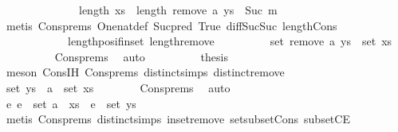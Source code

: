 \begin{isabellebody}
\ \ \ \ \isamarkupfalse%
\ {\isacharminus}\isanewline
\ \ \ \ \ \ \isamarkupfalse%
\ {\isachardoublequoteopen}length\ xs\ {\isacharminus}\ length\ {\isacharparenleft}remove{}\ a\ ys{\isacharparenright}\ {\isacharequal}\ Suc\ m{\isachardoublequoteclose}\isanewline
\ \ \ \ \ \ \ \ \isamarkupfalse%
\ {\isacharparenleft}metis\ Cons{\isachardot}prems{\isacharparenleft}{}{\isacharparenright}\ One{\isacharunderscore}nat{\isacharunderscore}def\ Suc{\isacharunderscore}pred\ True\ diff{\isacharunderscore}Suc{\isacharunderscore}Suc\ length{\isacharunderscore}Cons\isanewline
\ \ \ \ \ \ \ \ \ \ \ \ length{\isacharunderscore}pos{\isacharunderscore}if{\isacharunderscore}in{\isacharunderscore}set\ length{\isacharunderscore}remove{}{\isacharparenright}\isanewline
\ \ \ \ \ \ \isamarkupfalse%
\ \isamarkupfalse%
\ {\isachardoublequoteopen}set\ {\isacharparenleft}remove{}\ a\ ys{\isacharparenright}\ {\isasymsubseteq}\ set\ xs{\isachardoublequoteclose}\isanewline
\ \ \ \ \ \ \ \ \isamarkupfalse%
\ Cons{\isachardot}prems\ \isamarkupfalse%
\ auto\isanewline
\ \ \ \ \ \ \isamarkupfalse%
\ \isamarkupfalse%
\ {\isacharquery}thesis\isanewline
\ \ \ \ \ \ \ \ \isamarkupfalse%
\ {\isacharparenleft}meson\ Cons{\isachardot}IH\ Cons{\isachardot}prems\ distinct{\isachardot}simps{\isacharparenleft}{}{\isacharparenright}\ distinct{\isacharunderscore}remove{}{\isacharparenright}\isanewline
\ \ \ \ \isamarkupfalse%
\isanewline
\ \ \ \ \isamarkupfalse%
\ \isamarkupfalse%
\ {\isachardoublequoteopen}set\ ys\ {\isacharminus}\ {\isacharbraceleft}a{\isacharbraceright}\ {\isasymsubseteq}\ set\ xs{\isachardoublequoteclose}\isanewline
\ \ \ \ \ \ \isamarkupfalse%
\ Cons{\isachardot}prems{\isacharparenleft}{}{\isacharparenright}\ \isamarkupfalse%
\ auto\isanewline
\ \ \ \ \isamarkupfalse%
\ \isamarkupfalse%
\ {\isachardoublequoteopen}{\isasymexists}e{\isachardot}\ e\ {\isasymin}\ set\ {\isacharparenleft}a\ {\isacharhash}\ xs{\isacharparenright}\ {\isasymand}\ e\ {\isasymnotin}\ set\ ys{\isachardoublequoteclose}\isanewline
\ \ \ \ \ \ \isamarkupfalse%
\ {\isacharparenleft}metis\ Cons{\isachardot}prems{\isacharparenleft}{}{\isacharparenright}\ distinct{\isachardot}simps{\isacharparenleft}{}{\isacharparenright}\ in{\isacharunderscore}set{\isacharunderscore}remove{}\ set{\isacharunderscore}subset{\isacharunderscore}Cons\ subsetCE{\isacharparenright}\isanewline

\end{isabellebody}
